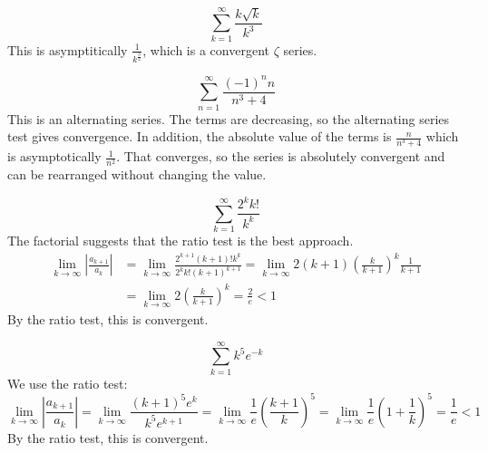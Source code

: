 \documentclass[fleqn]{report}
\begin{document}
\begin{example}
\begin{equation*}
\sum_{k=1}^\infty \frac{k\sqrt{k}}{k^3}
\end{equation*}
This is asymptitically $\frac{1}{k^{\frac{3}{2}}}$, which is a
convergent $\zeta$ series.
\end{example}

\begin{example}
\begin{equation*}
\sum_{n=1}^\infty \frac{(-1)^n n}{n^3+4}
\end{equation*}
This is an alternating series. The terms are decreasing, so the
alternating series test gives convergence.
In addition, the absolute value of the terms is $\frac{n}{n^3+4}$
which is asymptotically $\frac{1}{n^2}$. That converges, so the
series is absolutely convergent and can be rearranged without
changing the value.
\end{example}

\begin{example}
\begin{equation*}
\sum_{k=1}^\infty \frac{2^k k!}{k^k}
\end{equation*}
The factorial suggests that the ratio test is the best
approach.
\begin{align*}
\lim_{k \rightarrow \infty} \left| \frac{a_{k+1}}{a_k} \right|
& = \lim_{k \rightarrow \infty} \frac{2^{k+1} (k+1)! k^k}{2^k
k! (k+1)^{k+1}} 
= \lim_{k \rightarrow \infty} 2 (k+1) \left( \frac{k}{k+1} \right)^k
\frac{1}{k+1} \\
& = \lim_{k \rightarrow \infty} 2 \left( \frac{k}{k+1}
\right)^k = \frac{2}{e} < 1 
\end{align*}
By the ratio test, this is convergent.
\end{example}

\begin{example}
\begin{equation*}
\sum_{k=1}^\infty k^5 e^{-k}
\end{equation*}
We use the ratio test:
\begin{equation*}
\lim_{k \rightarrow \infty} \left| \frac{a_{k+1}}{a_k} \right|
= \lim_{k \rightarrow \infty} \frac{(k+1)^5 e^k}{k^5
e^{k+1}} 
= \lim_{k \rightarrow \infty} \frac{1}{e} \left(
\frac{k+1}{k} \right)^5 
= \lim_{k \rightarrow \infty} \frac{1}{e} \left( 1 +
\frac{1}{k} \right)^5 = \frac{1}{e} < 1
\end{equation*}
By the ratio test, this is convergent.
\end{example}
\end{document}
